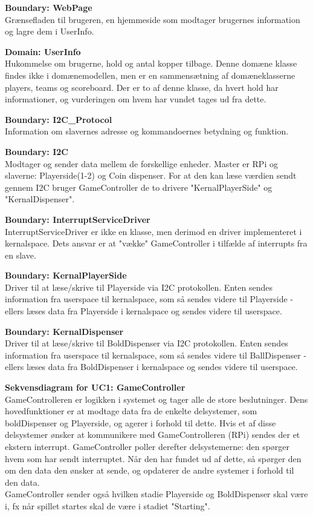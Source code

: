 \documentclass[Arkitektur/System_main.tex]{subfiles}
\begin{document}
\textbf{Boundary:  WebPage}\\
Grænsefladen til brugeren, en hjemmeside som modtager brugernes information og lagre dem i UserInfo. 

\textbf{Domain:  UserInfo}\\
Hukommelse om brugerne, hold og antal kopper tilbage. Denne domæne klasse findes ikke i domænemodellen, men er en sammensætning af domæneklasserne players, teams og scoreboard. Der er to af denne klasse, da hvert hold har informationer, og vurderingen om hvem har vundet tages ud fra dette. 

\textbf{Boundary:  I2C\_Protocol}\\
Information om slavernes adresse og kommandoernes betydning og funktion. 

\textbf{Boundary:  I2C}\\
Modtager og sender data mellem de forskellige enheder. Master er RPi og slaverne: Playerside(1-2) og Coin dispenser. For at den kan læse værdien sendt gennem I2C bruger GameController de to drivere "KernalPlayerSide" og "KernalDispenser". 

\textbf{Boundary:  InterruptServiceDriver}\\
InterruptServiceDriver er ikke en klasse, men derimod en driver implementeret i kernalspace. Dets ansvar er at "vække" \space GameController i tilfælde af interrupts fra en slave. 


\textbf{Boundary:  KernalPlayerSide}\\
Driver til at læse/skrive til Playerside via I2C protokollen. Enten sendes information fra userspace til kernalspace, som så sendes videre til Playerside - ellers læses data fra Playerside i kernalspace og sendes videre til userspace. 

\textbf{Boundary:  KernalDispenser}\\
Driver til at læse/skrive til BoldDispenser via I2C protokollen. Enten sendes information fra userspace til kernalspace, som så sendes videre til BallDispenser - ellers læses data fra BoldDispenser i kernalspace og sendes videre til userspace. 

\textbf{Sekvensdiagram for UC1: GameController}\\
GameControlleren er logikken i systemet og tager alle de store beslutninger. Dens hovedfunktioner er at modtage data fra de enkelte delsystemer, som boldDispenser og Playerside, og agerer i forhold til dette. Hvis et af disse delsystemer ønsker at kommunikere med GameControlleren (RPi) sendes der et ekstern interrupt. GameController poller derefter delsystemerne: den spørger hvem som har sendt interruptet. Når den har fundet ud af dette, så spørger den om den data den ønsker at sende, og opdaterer de andre systemer i forhold til den data. 
\\GameController sender også hvilken stadie Playerside og BoldDispenser skal være i, fx når spillet startes skal de være i stadiet "Starting". 
\end{document}
